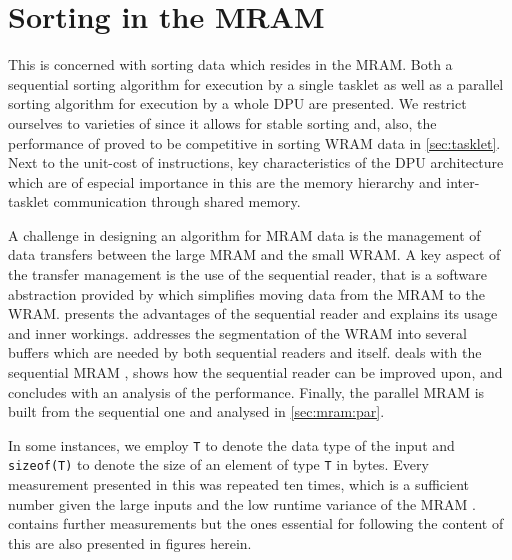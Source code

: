 \chapter[Sorting in the \texorpdfstring{\abb{MRAM}}{MRAM}]{Sorting in the \acs*{MRAM}}
\label{sec:mram}

This  is concerned with sorting data which resides in the \ac{MRAM}.
Both a sequential sorting algorithm for execution by a single tasklet as well as a parallel sorting algorithm for execution by a whole \ac{DPU} are presented.
We restrict ourselves to varieties of \MS{} since it allows for stable sorting and, also, the performance of \MS{} proved to be competitive in sorting \ac{WRAM} data in \cref{sec:tasklet}.
Next to the unit-cost of instructions, key characteristics of the \ac{DPU} architecture which are of especial importance in this  are the memory hierarchy and inter-tasklet communication through shared memory.

A challenge in designing an algorithm for \ac{MRAM} data is the management of data transfers between the large \ac{MRAM} and the small \ac{WRAM}.
A key aspect of the transfer management is the use of the sequential reader, that is a software abstraction provided by \upmem{} which simplifies moving data from the \ac{MRAM} to the \ac{WRAM}.
 presents the advantages of the sequential reader and explains its usage and inner workings.
 addresses the segmentation of the \ac{WRAM} into several buffers which are needed by both sequential readers and \MS{} itself.
 deals with the sequential \ac{MRAM} \MS{}, shows how the sequential reader can be improved upon, and concludes with an analysis of the performance.
Finally, the parallel \ac{MRAM} \MS{} is built from the sequential one and analysed in \cref{sec:mram:par}.

In some instances, we employ \lstinline|T| to denote the data type of the input and \lstinline[keywords={}]|sizeof(T)| to denote the size of an element of type \lstinline|T| in bytes.
Every measurement presented in this  was repeated ten times, which is a sufficient number given the large inputs and the low runtime variance of the \ac{MRAM} \MS*{}.
 contains further measurements but the ones essential for following the content of this  are also presented in figures herein.








